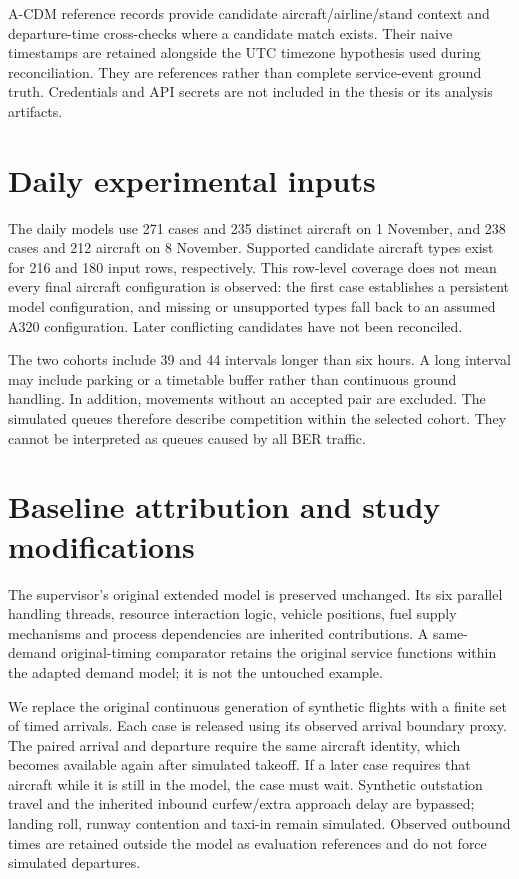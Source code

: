 A-CDM reference records provide candidate aircraft/airline/stand context and departure-time cross-checks where a candidate match exists. Their naive timestamps are retained alongside the UTC timezone hypothesis used during reconciliation. They are references rather than complete service-event ground truth. Credentials and API secrets are not included in the thesis or its analysis artifacts.

\section{Daily experimental inputs}
The daily models use 271 cases and 235 distinct aircraft on 1 November, and 238 cases and 212 aircraft on 8 November. Supported candidate aircraft types exist for 216 and 180 input rows, respectively. This row-level coverage does not mean every final aircraft configuration is observed: the first case establishes a persistent model configuration, and missing or unsupported types fall back to an assumed A320 configuration. Later conflicting candidates have not been reconciled.

The two cohorts include 39 and 44 intervals longer than six hours. A long interval may include parking or a timetable buffer rather than continuous ground handling. In addition, movements without an accepted pair are excluded. The simulated queues therefore describe competition within the selected cohort. They cannot be interpreted as queues caused by all BER traffic.

\section{Baseline attribution and study modifications}
The supervisor's original extended model is preserved unchanged. Its six parallel handling threads, resource interaction logic, vehicle positions, fuel supply mechanisms and process dependencies are inherited contributions. A same-demand original-timing comparator retains the original service functions within the adapted demand model; it is not the untouched example.

We replace the original continuous generation of synthetic flights with a finite set of timed arrivals. Each case is released using its observed arrival boundary proxy. The paired arrival and departure require the same aircraft identity, which becomes available again after simulated takeoff. If a later case requires that aircraft while it is still in the model, the case must wait. Synthetic outstation travel and the inherited inbound curfew/extra approach delay are bypassed; landing roll, runway contention and taxi-in remain simulated. Observed outbound times are retained outside the model as evaluation references and do not force simulated departures.

